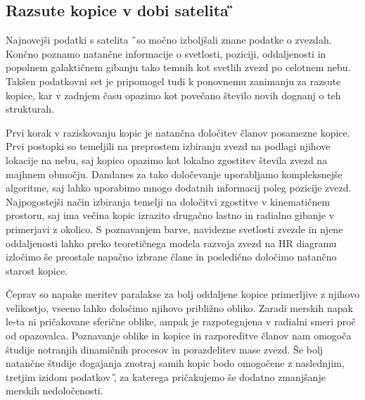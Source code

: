 \subsection{Razsute kopice v dobi satelita \G}
Najnovejši podatki s satelita \G\ so močno izboljšali znane podatke o zvezdah. Končno poznamo natančne informacije o svetlosti, poziciji, oddaljenosti in popolnem galaktičnem gibanju tako temnih kot svetlih zvezd po celotnem nebu. Takšen podatkovni set je pripomogel tudi k ponovnemu zanimanju za razsute kopice, kar v zadnjem času opazimo kot povečano število novih dognanj o teh strukturah.

Prvi korak v raziskovanju kopic je natančna določitev članov posamezne kopice. Prvi postopki so temeljili na preprostem izbiranju zvezd na podlagi njihove lokacije na nebu, saj kopico opazimo kot lokalno zgostitev števila zvezd na majhnem območju. Dandanes za tako določevanje uporabljamo kompleksnejše algoritme, saj lahko uporabimo mnogo dodatnih informacij poleg pozicije zvezd. Najpogostejši način izbiranja temelji na določitvi zgostitve v kinematičnem prostoru, saj ima večina kopic izrazito drugačno lastno in radialno gibanje v primerjavi z okolico. S poznavanjem barve, navidezne svetlosti zvezde in njene oddaljenosti lahko preko teoretičnega modela razvoja zvezd na HR diagramu izločimo še preostale napačno izbrane člane in posledično določimo natančno starost kopice.

Čeprav so napake meritev paralakse za bolj oddaljene kopice primerljive z njihovo velikostjo, vseeno lahko določimo njihovo približno obliko. Zaradi merskih napak le-ta ni pričakovane sferične oblike, ampak je razpotegnjena v radialni smeri proč od opazovalca. Poznavanje oblike in kopice in razporeditve članov nam omogoča študije notranjih dinamičnih procesov in porazdelitev mase zvezd. Še bolj natančne študije dogajanja znotraj samih kopic bodo omogočene z naslednjim, tretjim izidom podatkov \G, za katerega pričakujemo še dodatno zmanjšanje merskih nedoločenosti.

